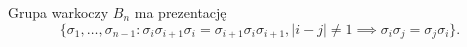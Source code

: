 \begin{comment}
        \draw[semithick, decoration={brace,mirror,raise=3pt},decorate]  (-2.75, -3) -- node[below=6pt] {$1_3$} (2.75, -3);
    \end{tikzpicture}
    \quad\quad\quad
    \begin{tikzpicture}[baseline=-0.65ex, scale=0.2]
        \useasboundingbox (-6, -3) rectangle (12, 5);
\begin{knot}[clip width=5, end tolerance=1pt]
        \strand[semithick] (-6, 0) .. controls (-4, 0) and (-5, 2) .. (-3, 2);
        \strand[semithick] (-6, 2) .. controls (-4, 2) and (-5, 0) .. (-3, 0);
        \strand[semithick] (-6, -2) to (-3, -2);
        \strand[semithick] (-3, 0) .. controls (-1, 0) and (-2, -2) .. (0, -2);
        \strand[semithick] (-3, -2) .. controls (-1, -2) and (-2, 0) .. (0, 0);
        \strand[semithick] (-3, 2) to (0, 2);
        \draw (-6, -3) rectangle (0, 3);
        \draw[semithick, decoration={brace,mirror,raise=3pt},decorate]  (-5.75, -3) -- node[below=6pt] {$\beta_1$} (-0.25, -3);
        \strand[semithick] (+6, 0) .. controls (+4, 0) and (+5, 2) .. (+3, 2);
        \strand[semithick] (+6, 2) .. controls (+4, 2) and (+5, 0) .. (+3, 0);
        \strand[semithick] (+6, -2) to (+3, -2);
        \strand[semithick] (+3, 0) .. controls (+1, 0) and (+2, -2) .. (0, -2);
        \strand[semithick] (+3, -2) .. controls (+1, -2) and (+2, 0) .. (0, 0);
        \strand[semithick] (+3, 2) to (0, 2);
        \draw (+6, -3) rectangle (0, 3);
        \strand[semithick] (6+6, 0) .. controls (6+4, 0) and (6+5, 2) .. (6+3, 2);
        \strand[semithick] (6+6, 2) .. controls (6+4, 2) and (6+5, 0) .. (6+3, 0);
        \strand[semithick] (6+6, -2) to (6+3, -2);
        \strand[semithick] (6+3, 0) .. controls (6+1, 0) and (6+2, -2) .. (6+0, -2);
        \strand[semithick] (6+3, -2) .. controls (6+1, -2) and (6+2, 0) .. (6+0, 0);
        \strand[semithick] (6+3, 2) to (6+0, 2);
        \draw (6+6, -3) rectangle (6+0, 3);
        \draw[semithick, decoration={brace,mirror,raise=3pt},decorate]  (0.25, -3) -- node[below=6pt] {$\beta_2\beta_3$} (11.75, -3);
        \draw[semithick, decoration={brace,raise=3pt},decorate]  (6.25, 3) -- node[above=6pt] {$\beta_3$} (11.75, 3);
        \draw[semithick, decoration={brace,raise=3pt},decorate]  (-5.75, 3) -- node[above=6pt] {$\beta_1\beta_2$} (5.75, 3);
    \end{knot}
    \end{tikzpicture}
\]
\end{comment}

\begin{proposition}
    Grupa warkoczy $B_n$ ma prezentację
    \begin{equation}
        \{\sigma_1, \ldots, \sigma_{n-1} : \sigma_i\sigma_{i+1} \sigma_i = \sigma_{i+1} \sigma_i \sigma_{i+1}, |i-j| \neq 1 \implies \sigma_i \sigma_j = \sigma_j \sigma_i\}.
    \end{equation}
\end{proposition}

